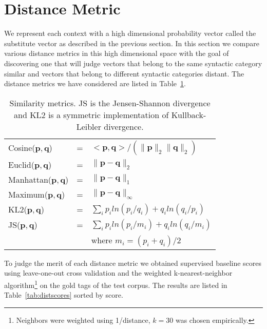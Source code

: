 \section{Distance Metric}
\label{sec:dist}

We represent each context with a high dimensional probability vector
called the substitute vector as described in the previous section.  In
this section we compare various distance metrics in this high
dimensional space with the goal of discovering one that will judge
vectors that belong to the same syntactic category similar and vectors
that belong to different syntactic categories distant.  The distance
metrics we have considered are listed in Table~\ref{tab:metrics}.

\begin{table}[ht] \centering
\small
\begin{tabular}{|lll|}
\hline
Cosine($\mathbf{p}, \mathbf{q}$) & = & $<\mathbf{p},\mathbf{q}> / (\|\mathbf{p}\|_{2} \|\mathbf{q}\|_{2})$ \\
Euclid($\mathbf{p}, \mathbf{q}$) & = & $\|\mathbf{p} - \mathbf{q}\|_{2}$ \\
Manhattan($\mathbf{p}, \mathbf{q}$) & = & $\|\mathbf{p} - \mathbf{q}\|_{1}$ \\
Maximum($\mathbf{p}, \mathbf{q}$) & = & $\|\mathbf{p} - \mathbf{q}\|_{\infty}$ \\
KL2($\mathbf{p}, \mathbf{q}$) & = & $\sum_i p_iln(p_i/q_i) + q_iln(q_i/p_i) $\\
JS($\mathbf{p}, \mathbf{q}$) & = & $\sum_i p_iln(p_i/m_i) + q_iln(q_i/m_i) $\\
& & where $m_i = (p_i + q_i) / 2$\\
\hline
\end{tabular}
\caption{Similarity metrics.  JS is the Jensen-Shannon divergence and
  KL2 is a symmetric implementation of Kullback-Leibler divergence.}
\label{tab:metrics}
\end{table}

To judge the merit of each distance metric we obtained supervised
baseline scores using leave-one-out cross validation and the weighted
k-nearest-neighbor algorithm\footnote{Neighbors were weighted using
  1/distance, $k=30$ was chosen empirically.} on the gold tags of the
test corpus.  The results are listed in Table~\ref{tab:distscores}
sorted by score.  

